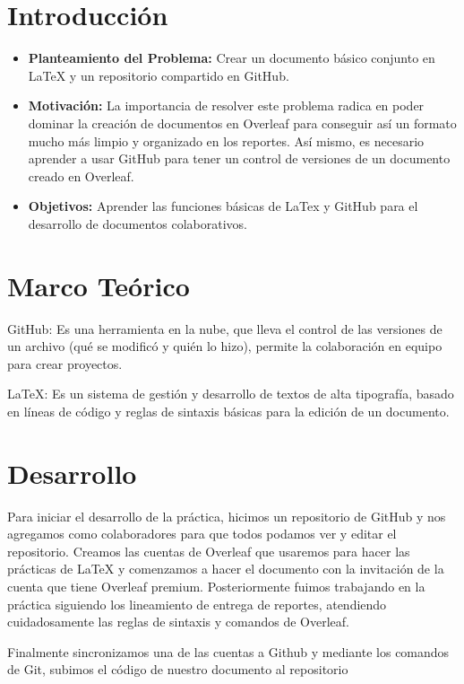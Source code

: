 \documentclass[letterpaper,12pt]{article}
\begin{document}
\tableofcontents
\clearpage

\section{Introducción}

\begin{itemize}
\item \textbf{Planteamiento del Problema:} Crear un documento básico conjunto en LaTeX y un repositorio compartido en GitHub.
\item \textbf{Motivación:} La importancia de resolver este problema radica en poder dominar la creación de documentos en Overleaf para conseguir así un formato mucho más limpio y organizado en los reportes. Así mismo, es necesario aprender a usar GitHub para tener un control de versiones de un documento creado en Overleaf.
\item \textbf{Objetivos:} Aprender las funciones básicas de LaTex y GitHub para el desarrollo de documentos colaborativos.
\end{itemize}
\section{Marco Teórico}
GitHub: Es una herramienta en la nube, que lleva el control de las versiones de un archivo (qué se modificó y quién lo hizo), permite la colaboración en equipo para crear proyectos.~\cite{guiagit}

LaTeX: Es un sistema de gestión y desarrollo de textos de alta tipografía, basado en líneas de código y reglas de sintaxis básicas para la edición de un documento.~\cite{guialatex}

\section{Desarrollo}
Para iniciar el desarrollo de la práctica, hicimos un repositorio de GitHub y nos agregamos como colaboradores para que todos podamos ver y editar el repositorio. Creamos las cuentas de Overleaf que usaremos para hacer las prácticas de LaTeX y comenzamos a hacer el documento con la invitación de la cuenta que tiene Overleaf premium.
Posteriormente fuimos trabajando en la práctica siguiendo los lineamiento de entrega de reportes, atendiendo cuidadosamente las reglas de sintaxis y comandos de Overleaf.

Finalmente sincronizamos una de las cuentas a Github y mediante los comandos de Git, subimos el código de nuestro documento al repositorio
\end{document}
